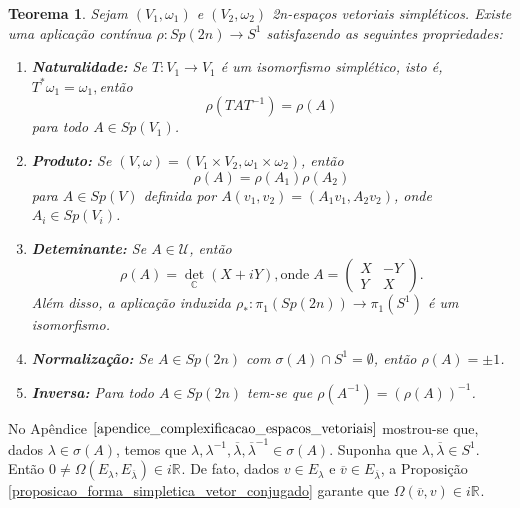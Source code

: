 \documentclass[12pt]{book}
\newtheorem{teorema}{Teorema}[section]
\newcommand{\circulo}{S^{1}}
\newcommand{\complexo}[1]{\mathbb{C}^{#1}}
\newcommand{\formaSimpleticaExtendida}[2]{\Omega(#1, #2)}
\newcommand{\grupofundamental}[1]{\pi_{1}(#1)}
\newcommand{\gruposimpletico}[1]{Sp(#1)}
\newcommand{\matrizSimpleticaOrtogonal}{\mathcal{U}}
\newcommand{\real}[1]{\mathbb{R}^{#1}}
\newcommand{\reta}{\real{}}
\begin{document}
	\begin{teorema}\label{teorema_aplicacao_rho}
		Sejam $(V_{1}, \omega_{1})$ e $(V_{2}, \omega_{2})$ 2n-espaços vetoriais simpléticos. Existe uma aplicação contínua $\rho:Sp(2n) \to S^{1}$ satisfazendo as seguintes propriedades:
		\begin{enumerate}
			\item \label{item_naturalidade_rho} \textbf{Naturalidade:}  Se $T:V_{1} \to V_{1}$ é um isomorfismo simplético, isto é, $T^{*}\omega_{1} = \omega_{1}, $então 
			$$
			\rho(TAT^{-1}) = \rho(A)
			$$
			para todo $A\in \gruposimpletico{V_{1}}$.
			
			\item \label{item_produto_rho} \textbf{Produto:} Se $(V,\omega) = (V_{1}\times V_{2},\omega_{1}\times \omega_{2})$, então
			$$
			\rho(A) = \rho(A_{1})\rho(A_{2})
			$$
			para $A\in \gruposimpletico{V}$ definida por $A(v_{1}, v_{2})=(A_{1}v_{1}, A_{2}v_{2})$, onde $A_{i} \in \gruposimpletico{V_{i}}$.
			
			\item \label{item_determinante_rho} \textbf{Deteminante:} Se $A\in \matrizSimpleticaOrtogonal$, então 
			$$
			\rho(A) = \det_{\complexo{}}(X+iY), \text{onde} \;	
			A=\left(
			\begin{array}{cc}
			X & -Y					\\
			Y & X
			\end{array}
			\right).
			$$
			Além disso, a aplicação induzida $\rho_{*}: \grupofundamental{\gruposimpletico{2n}} \to \grupofundamental{\circulo}$ é um isomorfismo.
			
			\item \label{item_normalizacao_rho} \textbf{Normalização:} Se $A \in \gruposimpletico{2n}$ com $\sigma(A)\cap \circulo = \emptyset$, então $\rho(A) = \pm 1$.
			
			\item \label{item_inversa_rho} \textbf{Inversa:} Para todo $A \in \gruposimpletico{2n}$ tem-se que $\rho(A^{-1})=(\rho(A))^{-1}$. 
		\end{enumerate}
	\end{teorema}
	
	No Apêndice $\ref{apendice_complexificacao_espacos_vetoriais}$ mostrou-se que, dados $\lambda \in \sigma(A)$, temos que $\lambda, \lambda^{-1}, \overline{\lambda}, \overline{\lambda}^{-1}  \in \sigma(A)$. Suponha que $\lambda, \overline{\lambda} \in \circulo$. Então $0 \neq \formaSimpleticaExtendida{E_{\lambda}}{E_{\overline{\lambda}}} \in i\reta$. De fato, dados $v \in E_{\lambda}$ e $\overline{v} \in E_{\overline{\lambda}}$, a Proposição \ref{proposicao_forma_simpletica_vetor_conjugado} garante que  $\formaSimpleticaExtendida{\overline{v}}{v} \in i\reta$.
	
\end{document}
